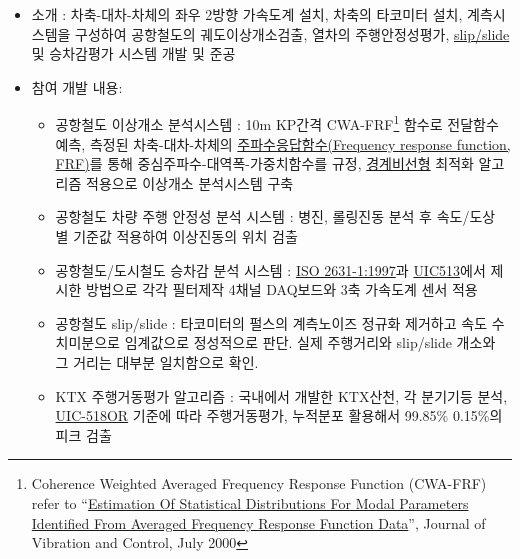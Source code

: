 \begin{itemize}[label=]
	\item 소개 : 차축-대차-차체의 좌우 2방향 가속도계 설치, 차축의 타코미터 설치, 계측시스템을 구성하여 공항철도의 궤도이상개소검출, 열차의 주행안정성평가, \href{http://ieeexplore.ieee.org/xpl/login.jsp?tp=\&arnumber=264942\&url=http\%3A\%2F\%2Fieeexplore.ieee.org\%2Fxpls\%2Fabs_all.jsp\%3Farnumber\%3D264942}{slip/slide} 및 승차감평가 시스템 개발 및 준공
	\item 참여 개발 내용:
	      \begin{itemize}[label=]
		      \item 공항철도 이상개소 분석시스템 : 10m KP간격 CWA-FRF\footnote{Coherence Weighted Averaged Frequency Response Function (CWA-FRF) refer to ``\href{http://institute.lanl.gov/ei/shm/pubs/modal_stat_jvc_jul00.pdf}{Estimation Of Statistical Distributions For Modal Parameters Identified From Averaged Frequency Response Function Data}'', Journal of Vibration and Control, July 2000} 함수로 전달함수 예측, 측정된 차축-대차-차체의 \href{https://en.wikipedia.org/wiki/Frequency_response}{주파수응답함수(Frequency response function, FRF)}를 통해 중심주파수-대역폭-가중치함수를 규정, \href{http://www.scholarpedia.org/article/Boundary_value_problem}{경계비선형} 최적화 알고리즘 적용으로 이상개소 분석시스템 구축
		      \item 공항철도 차량 주행 안정성 분석 시스템 : 병진, 롤링진동 분석 후 속도/도상 별 기준값 적용하여 이상진동의 위치 검출
		      \item 공항철도/도시철도 승차감 분석 시스템 : \href{http://www.iso.org/iso/catalogue_detail.htm?csnumber=7612}{ISO 2631-1:1997}과 \href{http://www.uic.org/etf/codex/codex-detail.php?codeFiche=513\&langue_fiche=E}{UIC513}에서 제시한 방법으로 각각 필터제작 4채널 DAQ보드와 3축 가속도계 센서 적용
		      \item 공항철도 slip/slide : 타코미터의 펄스의 계측노이즈 정규화 제거하고 속도 수치미분으로 임계값으로 정성적으로 판단. 실제 주행거리와 slip/slide 개소와 그 거리는 대부분 일치함으로 확인.
		      \item KTX 주행거동평가 알고리즘 : 국내에서 개발한 KTX산천, 각 분기기등 분석, \href{http://www.uic.org/etf/codex/codex-detail.php?langue_fiche=E\&codeFiche=518}{UIC-518OR} 기준에 따라 주행거동평가, 누적분포 활용해서 99.85\% 0.15\%의 피크 검출


\end{itemize}
\end{itemize}
